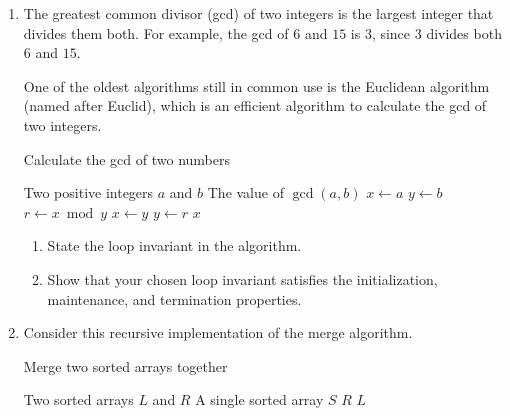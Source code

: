 \begin{exercises}
\begin{enumerate}
    \item[\challenge] The greatest common divisor (gcd) of two integers is the largest integer that divides them both. For example, the gcd of $6$ and $15$ is $3$, since $3$ divides both $6$ and $15$.

        One of the oldest algorithms still in common use is the Euclidean algorithm (named after Euclid), which is an efficient algorithm to calculate the gcd of two integers. 

        \begin{algorithm}[H]
            \caption{Calculate the gcd of two numbers}
            \begin{algorithmic}[1]
                \Require Two positive integers $a$ and $b$
                \Ensure The value of $\gcd\left(a, b\right)$
                    \State $x \gets a$
                    \State $y \gets b$
                        \State $r \gets x \bmod y$
                        \State $x \gets y$
                        \State $y \gets r$
                    \EndWhile
                    \Return $x$
                \EndFunction
            \end{algorithmic}
        \end{algorithm}

        \begin{enumerate}
            \item State the loop invariant in the algorithm.
            \item Show that your chosen loop invariant satisfies the initialization, maintenance, and termination properties.
        \end{enumerate}

        \item[\challenge] Consider this recursive implementation of the merge algorithm.
        \begin{algorithm}[H]
            \caption{Merge two sorted arrays together}
            \begin{algorithmic}[1]
                \Require Two sorted arrays $L$ and $R$
                \Ensure A single sorted array $S$
                        \Return $R$
                        \Return $L$
                    \EndIf
                        \Return {}
                    \Else
                        \Return {}
                    \EndIf
                \EndFunction
            \end{algorithmic}
        \end{algorithm}


\end{enumerate}
\end{exercises}
